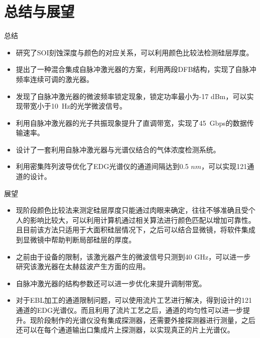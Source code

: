 \documentclass{beamer}
\begin{document}
\section{总结与展望}
\frame{\tableofcontents[currentsection]}
\begin{frame}{总结}
\begin{itemize}
	\item 研究了\mbox{SOI}刻蚀深度与颜色的对应关系，可以利用颜色比较法检测硅层厚度。
	\item 提出了一种混合集成自脉冲激光器的方案，利用两段DFB结构，实现了自脉冲频率连续可调的激光器。
	\item 发现了自脉冲激光器的微波频率锁定现象，锁定功率最小为-17 dBm，可以实现带宽小于10~Hz的光学微波信号。
	\item 利用自脉冲激光器的光子共振现象提升了直调带宽，实现了45~Gbps的数据传输速率。
	\item 设计了一套利用自脉冲激光器与光谱仪结合的气体浓度检测系统。
	\item 利用密集阵列波导优化了EDG光谱仪的通道间隔达到0.5 $nm$，可以实现121通道的设计。
\end{itemize}
\end{frame}

\begin{frame}{展望}
\begin{itemize}
	\item 现阶段颜色比较法来测定硅层厚度只能通过肉眼来确定，往往不够准确且受个人的影响比较大，可以利用计算机通过相关算法进行颜色匹配以增加可靠性。且目前该方法只适用于大面积硅层情况下，之后可以结合显微镜，将软件集成到显微镜中帮助判断局部硅层的厚度。
	\item 之前由于设备的限制，该激光器产生的微波信号只测到40 GHz，可以进一步研究该激光器在太赫兹波产生方面的应用。
	\item 自脉冲激光器的结构参数还可以进一步优化来提升调制带宽。
	\item 对于EBL加工的通道限制问题，可以使用流片工艺进行解决，得到设计的121通道的EDG光谱仪。而且利用了流片工艺之后，通道的均匀性可以进一步提升。现阶段制作的光谱仪没有集成探测器，还需要外接探测器进行测量，之后还可以在每个通道输出口集成片上探测器，以实现真正的片上光谱仪。
\end{itemize}
\end{frame}
\end{document}

